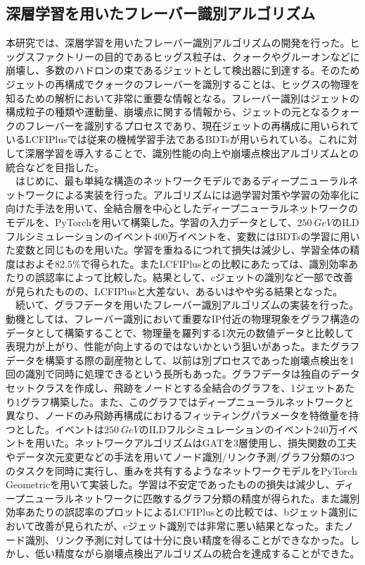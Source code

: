\subsection*{深層学習を用いたフレーバー識別アルゴリズム}
本研究では、深層学習を用いたフレーバー識別アルゴリズムの開発を行った。ヒッグスファクトリーの目的であるヒッグス粒子は、クォークやグルーオンなどに崩壊し、多数のハドロンの束であるジェットとして検出器に到達する。そのためジェットの再構成でクォークのフレーバーを識別することは、ヒッグスの物理を知るための解析において非常に重要な情報となる。フレーバー識別はジェットの構成粒子の種類や運動量、崩壊点に関する情報から、ジェットの元となるクォークのフレーバーを識別するプロセスであり、現在ジェットの再構成に用いられているLCFIPlusでは従来の機械学習手法であるBDTsが用いられている。これに対して深層学習を導入することで、識別性能の向上や崩壊点検出アルゴリズムとの統合などを目指した。\\
　はじめに、最も単純な構造のネットワークモデルであるディープニューラルネットワークによる実装を行った。アルゴリズムには過学習対策や学習の効率化に向けた手法を用いて、全結合層を中心としたディープニューラルネットワークのモデルを、PyTorchを用いて構築した。学習の入力データとして、$\SI{250}{GeV}$のILDフルシミュレーションのイベント400万イベントを、変数にはBDTsの学習に用いた変数と同じものを用いた。学習を重ねるにつれて損失は減少し、学習全体の精度はおよそ82.5\%で得られた。またLCFIPlusとの比較にあたっては、識別効率あたりの誤認率によって比較した。結果として、cジェットの識別など一部で改善が見られたものの、LCFIPlusと大差ない、あるいはやや劣る結果となった。\\
　続いて、グラフデータを用いたフレーバー識別アルゴリズムの実装を行った。動機としては、フレーバー識別において重要なIP付近の物理現象をグラフ構造のデータとして構築することで、物理量を羅列する1次元の数値データと比較して表現力が上がり、性能が向上するのではないかという狙いがあった。またグラフデータを構築する際の副産物として、以前は別プロセスであった崩壊点検出を1回の識別で同時に処理できるという長所もあった。グラフデータは独自のデータセットクラスを作成し、飛跡をノードとする全結合のグラフを、1ジェットあたり1グラフ構築した。また、このグラフではディープニューラルネットワークと異なり、ノードのみ飛跡再構成におけるフィッティングパラメータを特徴量を持つとした。イベントは$\SI{250}{GeV}$のILDフルシミュレーションのイベント240万イベントを用いた。ネットワークアルゴリズムはGATを3層使用し、損失関数の工夫やデータ次元変更などの手法を用いてノード識別/リンク予測/グラフ分類の3つのタスクを同時に実行し、重みを共有するようなネットワークモデルをPyTorch Geometricを用いて実装した。学習は不安定であったものの損失は減少し、ディープニューラルネットワークに匹敵するグラフ分類の精度が得られた。また識別効率あたりの誤認率のプロットによるLCFIPlusとの比較では、bジェット識別において改善が見られたが、cジェット識別では非常に悪い結果となった。またノード識別、リンク予測に対しては十分に良い精度を得ることができなかった。しかし、低い精度ながら崩壊点検出アルゴリズムの統合を達成することができた。\\
